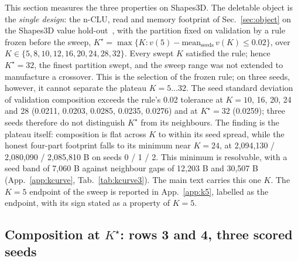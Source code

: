 \documentclass{article} %
\newcommand{\Kstar}{\ensuremath{K^{\star}}}
\begin{document}
This section measures the three properties on Shapes3D. The deletable object is the \emph{single design}: the n-CLU, read and memory footprint of
Sec.~\ref{sec:object} on the Shapes3D value hold-out~\citep{montero2021role,schott2021visual}, with the partition fixed on validation
by a rule frozen before the sweep, $\Kstar=\max\{K : v(5)-\text{mean}_{\text{seeds}}\,v(K)\le
0.02\}$, over $K\in\{5,8,10,12,16,20,24,28,32\}$. Every swept $K$ satisfied the rule; hence
$\Kstar=32$, the finest partition swept, and the sweep range was not extended to manufacture a
crossover. %
This is the selection of the frozen rule; on three seeds, however, it cannot separate the plateau
$K=5\ldots32$. The seed standard deviation of validation composition exceeds the rule's 0.02
tolerance at $K=10$, 16, 20, 24 and 28 (0.0211, 0.0203, 0.0285, 0.0235, 0.0276) and at $\Kstar=32$ %
(0.0259); three seeds therefore do not distinguish $\Kstar$ from its neighbours. %
The finding is the plateau itself: composition is flat across $K$ to within its seed spread,
while the honest four-part footprint falls to its minimum near $K=24$, at 2,094,130 / 2,080,090 / 2,085,810 B %
on seeds 0 / 1 / 2. This minimum is resolvable, with a seed band of 7,060 B against neighbour gaps of %
12,203 B and 30,507 B (App.~\ref{app:kcurve}, Tab.~\ref{tab:kcurve3}). %
The main text carries this one $K$. The $K=5$ endpoint of the sweep is reported in
App.~\ref{app:k5}, labelled as the endpoint, with its sign stated as a property of $K=5$.

\subsection{Composition at $\Kstar$: rows 3 and 4, three scored seeds}
\label{sec:shapes-t7}
\end{document}
